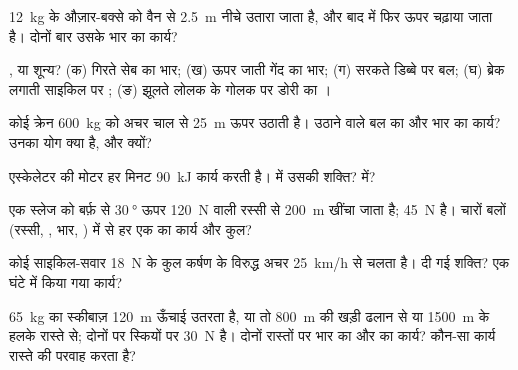 \begin{exercise}[$\star$]\label{exo:g11:work-of-force:2}
\qty{12}{kg} के औज़ार-बक्से को वैन से \qty{2.5}{m} नीचे उतारा जाता है, और बाद में फिर
ऊपर चढ़ाया जाता है। दोनों बार उसके भार का कार्य?
\end{exercise}

\begin{exercise}[$\star$]\label{exo:g11:work-of-force:3}
,  या शून्य? (क) गिरते सेब का भार;
(ख) ऊपर जाती गेंद का भार; (ग) सरकते डिब्बे पर  बल;
(घ) ब्रेक लगाती साइकिल पर ; (ङ) झूलते लोलक के गोलक पर डोरी का
।
\end{exercise}

\begin{exercise}[$\star$]\label{exo:g11:work-of-force:4}
कोई क्रेन \qty{600}{kg} को अचर चाल से \qty{25}{m} ऊपर उठाती है। उठाने वाले
बल का और भार का कार्य? उनका योग क्या है, और
क्यों?
\end{exercise}

\begin{exercise}[$\star$]\label{exo:g11:work-of-force:5}
एस्केलेटर की मोटर हर मिनट \qty{90}{kJ} कार्य करती है।
 में उसकी शक्ति?  में?
\end{exercise}

\begin{exercise}[$\star\star$]\label{exo:g11:work-of-force:6}
एक स्लेज को बर्फ़ से $\qty{30}{\degree}$ ऊपर \qty{120}{N}  वाली रस्सी से
\qty{200}{m} खींचा जाता है;  \qty{45}{N} है। चारों बलों (रस्सी,
, भार, ) में से हर एक का कार्य और कुल?
\end{exercise}

\begin{exercise}[$\star\star$]\label{exo:g11:work-of-force:7}
कोई साइकिल-सवार \qty{18}{N} के कुल कर्षण के विरुद्ध अचर \qty{25}{km/h} से चलता है। दी
गई शक्ति? एक घंटे में किया गया कार्य?
\end{exercise}

\begin{exercise}[$\star\star$]\label{exo:g11:work-of-force:8}
\qty{65}{kg} का स्कीबाज़ \qty{120}{m} ऊँचाई उतरता है, या तो \qty{800}{m} की खड़ी ढलान से या
\qty{1500}{m} के हलके रास्ते से; दोनों पर स्कियों पर  \qty{30}{N} है।
दोनों रास्तों पर भार का और  का कार्य? कौन-सा
कार्य रास्ते की परवाह करता है?
\end{exercise}

